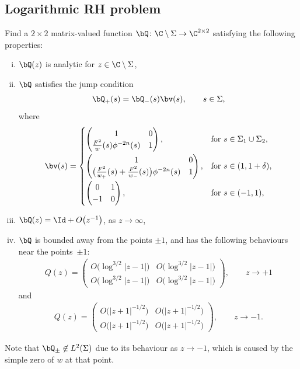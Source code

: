 \subsection{Logarithmic RH problem}\label{logRHP} Find a $2\times2$ matrix-valued function $\bQ \colon \C \setminus \Sigma \to \C^{2\times2}$ satisfying the following properties:
\begin{enumerate}[(i)]\itemsep=0pt
 \item $\bQ(z)$ is analytic for $z \in \C \setminus \Sigma$,
 \item $\bQ$ satisfies the jump condition
 \begin{align*}
 \bQ_+(s) = \bQ_-(s) \bv(s), \qquad s\in \Sigma,
 \end{align*}
 where
 \begin{align} \label{jumpMatrixV}
\bv(s) =
\begin{cases}
\begin{pmatrix}
1 & 0
\\
\frac{F^2}{w}(s) \phi^{-2n}(s) & 1
\end{pmatrix}, & \mbox{for} \ s \in \Sigma_1 \cup \Sigma_2,\vspace{1mm}
\\
\begin{pmatrix}
1 & 0
\\
\big(\frac{F^2}{w_+}(s)+\frac{F^2}{w_-}(s)\big) \phi^{-2n}(s) & 1
\end{pmatrix}, & \mbox{for}\  s\in(1,1+\delta),\vspace{1mm}
\\
\begin{pmatrix}
0 & 1
\\
-1 & 0
\end{pmatrix}, & \mbox{for}\ s \in (-1,1),
\end{cases}
\end{align}
\item $\bQ(z) = \Id + O\big(z^{-1}\big)$, as $z \rightarrow \infty$,
\item $\bQ$ is bounded away from the points $\pm 1$, and has the following behaviours near the points~$\pm1$:
\begin{align*}
 Q(z) = \begin{pmatrix}
 O\big(\log^{3/2}|z-1|\big) & O\big(\log^{3/2}|z-1|\big)
 \\
 O\big(\log^{3/2}|z-1|\big) & O\big(\log^{3/2}|z-1|\big)
 \end{pmatrix}, \qquad z\to +1
\end{align*}
and
\begin{align*}
 Q(z) = \begin{pmatrix}
 O\big(|z+1|^{-1/2}\big) & O\big(|z+1|^{-1/2}\big)
 \\
 O\big(|z+1|^{-1/2}\big) & O\big(|z+1|^{-1/2}\big)
 \end{pmatrix}, \qquad z \to -1.
\end{align*}
\end{enumerate}
Note that $\bQ_\pm \not \in L^2(\Sigma)$ due to its behaviour as $z\to -1$, which is caused by the simple zero of $w$ at that point.

